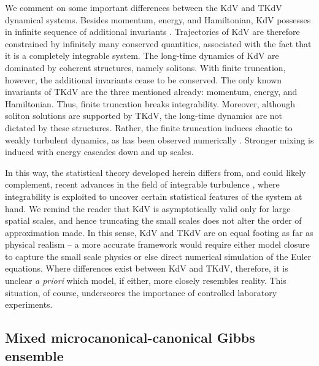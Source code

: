 \documentclass[11pt]{article}
\newcommand{\new}[1]{{ #1}}
\begin{document}
\new{We comment on some important differences between the KdV and TKdV dynamical systems. Besides momentum, energy, and Hamiltonian, KdV possesses in infinite sequence of additional invariants \cite{lax1975periodic, whitham2011linear}. Trajectories of KdV are therefore constrained by infinitely many conserved quantities, associated with the fact that it is a completely integrable system. The long-time dynamics of KdV are dominated by coherent structures, namely solitons. With finite truncation, however, the additional invariants cease to be conserved. The only known invariants of TKdV are the three mentioned already: momentum, energy, and Hamiltonian. Thus, finite truncation breaks integrability. Moreover, although soliton solutions are supported by TKdV, the long-time dynamics are not dictated by these structures. Rather, the finite truncation induces chaotic to weakly turbulent dynamics, as has been observed numerically \cite{bajars2013weakly, majdaqi2019}. Stronger mixing is induced with energy cascades down and up scales.

In this way, the statistical theory developed herein differs from, and could likely complement, recent advances in the field of integrable turbulence \cite{zakharov2009turbulence, randoux2014intermittency, costa2014soliton, randoux2016nonlinear}, where  integrability is exploited to uncover certain statistical features of the system at hand. We remind the reader that KdV is asymptotically valid only for large spatial scales, and hence truncating the small scales does not alter the order of approximation made. In this sense, KdV and TKdV are on equal footing as far as physical realism -- a more accurate framework would require either model closure to capture the small scale physics or else direct numerical simulation of the Euler equations. Where differences exist between KdV and TKdV, therefore, it is unclear {\em a priori} which model, if either, more closely resembles reality. This situation, of course, underscores the importance of controlled laboratory experiments.
}


\subsection{Mixed microcanonical-canonical Gibbs ensemble}
\end{document}
